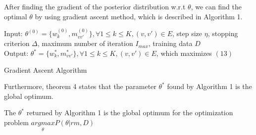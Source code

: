 \documentclass[conference]{IEEEtran}
\begin{document}
After finding the gradient of the posterior distribution w.r.t $\theta$, we can find the optimal $\theta$ by using gradient ascent method, which is described in Algorithm 1. 

\begin{algorithm}[H]
	Input: $\theta^{(0)}=\{w_{k}^{(0)},m_{vv'}^{(0)}\},\forall 1\leq k\leq K, (v,v')\in E$, step size $\eta$, stopping criterion $\Delta$, maximum number of iteration $I_{max}$, training data $D$ \\
	Output: $\theta^{*}=\{w_{k}^{*},m_{vv'}^{*}\},\forall 1\leq k\leq K, (v,v')\in E$, which maximizes $(13)$ \\
\caption{Gradient Ascent Algorithm}
\end{algorithm}
Furthermore, theorem 4 states that the parameter $\theta^{*}$ found by Algorithm 1 is the global optimum.  
\begin{mydef1}
	The $\theta^{*}$ returned by Algorithm 1 is the global optimum for the optimization problem $\underset{\theta}{argmax} P(\theta|rm, D)$
\end{mydef1}
\end{document}
